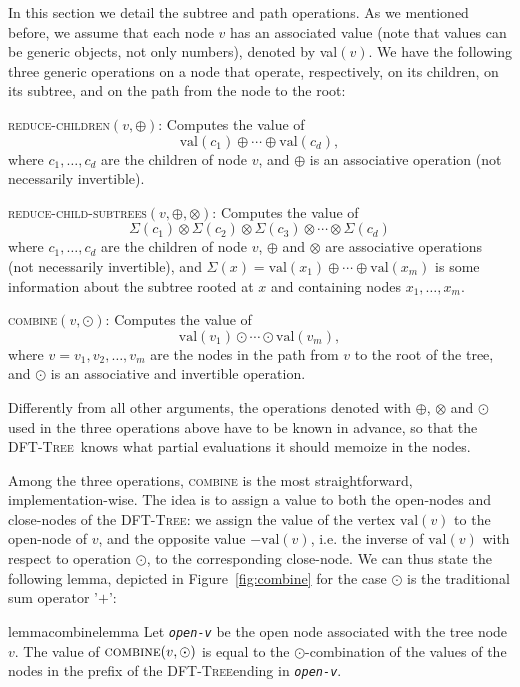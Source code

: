 \documentclass[a4paper,USenglish]{lipics}
\newcommand{\var}[1]{\textrm{\texttt{#1}}}
\newcommand{\dft}{\textsc{DFT-Tree}}
\begin{document}
In this section we detail the subtree and path operations. As we mentioned before, we assume that each node $v$ has an associated value (note that values can be generic objects, not only numbers), denoted by \textrm{val}$(v)$. We have the following three generic operations on a node that operate, respectively, on its children, on its subtree, and on the path from the node to the root:
		\begin{compactitem}
			\item \textsc{reduce-children}$(v, \oplus)$: Computes the value of 
			$$\textrm{val}(c_1) \oplus \cdots \oplus \textrm{val}(c_d),$$
			where $c_1, \ldots, c_d$ are the children of node $v$, and $\oplus$ is an associative operation (not necessarily invertible).
			\item \textsc{reduce-child-subtrees}$(v, \oplus, \otimes)$: Computes the value of $$\Sigma(c_1)\otimes\Sigma(c_2)\otimes\Sigma(c_3)\otimes\cdots\otimes\Sigma(c_d)$$
			where $c_1, \ldots, c_d$ are the children of node $v$, $\oplus$ and $\otimes$ are associative operations (not necessarily invertible), and $\Sigma(x) = \textrm{val}(x_1) \oplus \cdots \oplus \textrm{val}(x_m)$ is some information about the subtree rooted at $x$ and containing nodes $x_1, \ldots, x_m$.
			\item \textsc{combine}$(v, \odot)$: Computes the value of
			$$\textrm{val}(v_1) \odot \cdots \odot \textrm{val}(v_m),$$
			where $v = v_1, v_2, \ldots, v_m$ are the nodes in the path from $v$ to the root of the tree, and $\odot$ is an associative and invertible operation.
		\end{compactitem}
Differently from all other arguments, the operations denoted with $\oplus$, $\otimes$ and $\odot$ used in the three operations above have to be known in advance, so that the \dft\ knows what partial evaluations it should memoize in the nodes.

Among the three operations, \textsc{combine} is the most straightforward, implementation-wise. The idea is to assign a value to both the open-nodes and close-nodes of the \dft: we assign the value of the vertex $\textrm{val}(v)$ to the open-node of $v$, and the opposite value $-\textrm{val}(v)$, i.e. the inverse of $\textrm{val}(v)$ with respect to operation $\odot$, to the corresponding close-node. We can thus state the following lemma, depicted in Figure~\ref{fig:combine} for the case $\odot$ is the traditional sum operator '$+$':

			\begin{restatable}{lemma}{combinelemma}
				\label{lem:combine}
Let \emph{\var{open-v}} be the open node associated with the tree node $v$. The value of $\textsc{combine}(v, \odot)$
				is equal to the $\odot$-combination of the values of the nodes in the prefix of the \dft ending in \emph{\var{open-v}}.
			\end{restatable}
\end{document}

